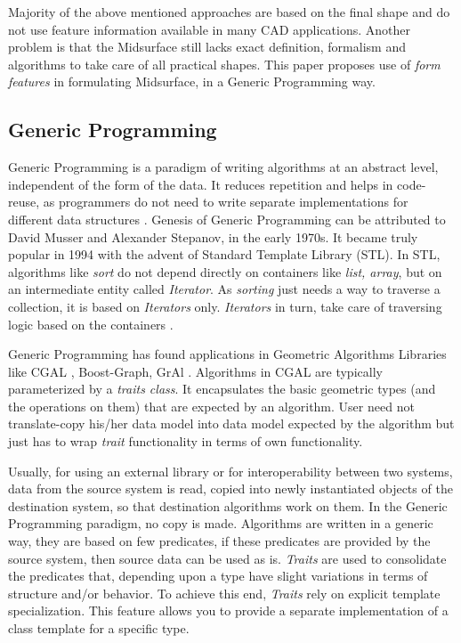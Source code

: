 Majority of the above mentioned approaches are based on the final shape and do not use feature information\cite{Smit2011} available in many CAD applications. Another problem is that the Midsurface still lacks exact definition, formalism and algorithms to take care of all practical shapes. This paper proposes use of {\em form features} in formulating Midsurface, in a Generic Programming way.

\subsection{Generic Programming}

Generic Programming is a paradigm of writing algorithms at an abstract level, independent of the form of the data. It reduces repetition and helps in code-reuse, as programmers do not need to write separate implementations for different data structures \cite{Giovannelli2013}. Genesis of Generic Programming can be attributed to David Musser and Alexander Stepanov, in the early 1970s. It became truly popular in 1994 with the advent of Standard Template Library (STL). In STL, algorithms like {\em sort} do not depend directly on containers like {\em list, array}, but on an intermediate entity called {\em Iterator}. As {\em sorting} just needs a way to traverse a collection, it is based on {\em Iterators} only. {\em Iterators} in turn, take care of traversing logic based on the containers \cite{Berti2000}.

Generic Programming has found applications in Geometric Algorithms Libraries like CGAL \cite{Bronnimann}, Boost-Graph, GrAl \cite{Berti2002}.  Algorithms in CGAL are typically parameterized by a {\em traits class}. It encapsulates the basic geometric types (and the operations on them) that are expected by an algorithm. User need not translate-copy his/her data model into data model expected by the algorithm but just has to wrap {\em trait} functionality in terms of own functionality.

Usually, for using an external library or for interoperability between two systems, data from the source system is read, copied into newly instantiated objects of the destination system, so that destination algorithms work on them. In the Generic Programming paradigm, no copy is made. Algorithms are written in a generic way, they are based on few predicates, if these predicates are provided by the source system, then source data can be used as is. {\em Traits} are used to consolidate the predicates that, depending upon a type have slight variations in terms of structure and/or behavior. To achieve this end, {\em Traits} rely on explicit template specialization.  This feature allows you to provide a separate implementation of a class template for a specific type.
